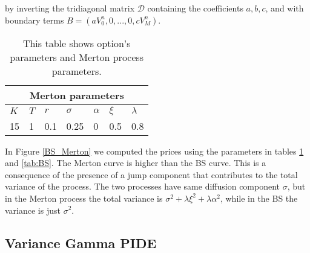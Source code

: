 by inverting the tridiagonal matrix $\mathcal{D}$ containing the coefficients $a,b,c$, and with boundary terms $B = (a V^{n}_{0}, 0, ... , 0, c V^{n}_{M})$.  
\begin{table}[t]
 \begin{center}
 \begin{minipage}{0.8\linewidth}
  \centering
  \begin{tabular}{||l|l|l||l|l|l|l||}
  \hline
  \multicolumn{7}{|c|}{Merton parameters} \\
  \hline
  $K$ & $T$ & $r$ & $\sigma$ & $\alpha$ &$\xi$ & $\lambda$ \\
  \hline
  15 & 1 & 0.1 & 0.25 & 0 & 0.5 & 0.8 \\
  \hline
  \end{tabular}
  \caption{This table shows option's parameters and Merton process parameters.}
  \label{tab:Mert}
 \end{minipage}
 \end{center}
\end{table}
In Figure \ref{BS_Merton} we computed the prices using the parameters in tables \ref{tab:Mert} and \ref{tab:BS}. The Merton curve is higher than the BS curve. This is a consequence 
of the presence of a jump component that contributes to the total variance of the process. The two processes have same diffusion component $\sigma$, 
but in the Merton process the total variance is $\sigma^2 + \lambda \xi^2 +\lambda \alpha^2$, while in the BS the variance is just $\sigma^2$.



\subsection{Variance Gamma PIDE}\label{VG_section2}

